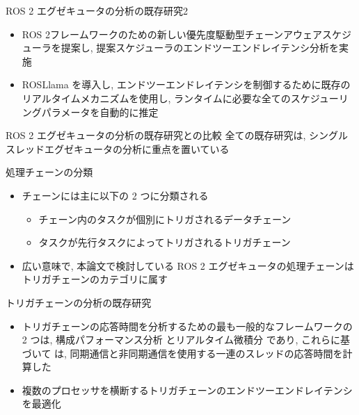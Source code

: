 \begin{frame}{ROS 2 エグゼキュータの分析の既存研究2}
    \begin{itemize}
        \item ROS 2フレームワークのための新しい優先度駆動型チェーンアウェアスケジューラを提案し, 提案スケジューラのエンドツーエンドレイテンシ分析を実施 \cite{choi2021picas}
        \item ROSLlama を導入し, エンドツーエンドレイテンシを制御するために既存のリアルタイムメカニズムを使用し, ランタイムに必要な全てのスケジューリングパラメータを自動的に推定 \cite{blass2021automatic}
    \end{itemize}
\end{frame}

\begin{frame}{ROS 2 エグゼキュータの分析の既存研究との比較}
    全ての既存研究は, シングルスレッドエグゼキュータの分析に重点を置いている
\end{frame}


\begin{frame}{処理チェーンの分類}
    \begin{itemize}
        \item チェーンには主に以下の 2 つに分類される
              \begin{itemize}
                  \item チェーン内のタスクが個別にトリガされるデータチェーン
                  \item タスクが先行タスクによってトリガされるトリガチェーン
              \end{itemize}
        \item 広い意味で, 本論文で検討している ROS 2 エグゼキュータの処理チェーンはトリガチェーンのカテゴリに属す
    \end{itemize}
\end{frame}

\begin{frame}{トリガチェーンの分析の既存研究}
    \begin{itemize}
        \item トリガチェーンの応答時間を分析するための最も一般的なフレームワークの 2 つは, 構成パフォーマンス分析 \cite{henia2005system} とリアルタイム微積分 \cite{chakraborty2003general} であり, これらに基づいて \cite{schlatow2016response} は, 同期通信と非同期通信を使用する一連のスレッドの応答時間を計算した
        \item 複数のプロセッサを横断するトリガチェーンのエンドツーエンドレイテンシを最適化 \cite{schliecker2009recursive}
    \end{itemize}
\end{frame}

